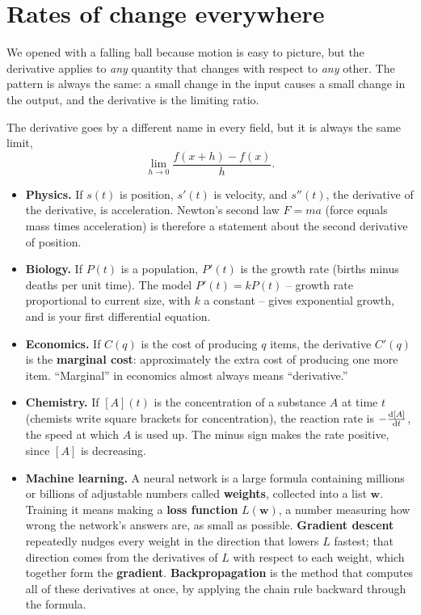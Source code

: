 \section{Rates of change everywhere}
\label{ch10:rates-everywhere}

We opened with a falling ball because motion is easy to picture, but the
derivative applies to \emph{any} quantity that changes with respect to
\emph{any} other. The pattern is always the same: a small change in the
input causes a small change in the output, and the derivative is the limiting
ratio.

\begin{applicationbox}
The derivative goes by a different name in every field, but it is always
the same limit,
\[
  \lim_{h\to 0}\frac{f(x+h)-f(x)}{h}.
\]
\begin{itemize}
  \item \textbf{Physics.} If $s(t)$ is position, $s'(t)$ is velocity, and
  $s''(t)$, the derivative of the derivative, is acceleration. Newton's second
  law $F = ma$ (force equals mass times acceleration) is therefore a statement
  about the second derivative of position.
  \item \textbf{Biology.} If $P(t)$ is a population, $P'(t)$ is the growth rate
  (births minus deaths per unit time). The model $P'(t) = kP(t)$ -- growth rate
  proportional to current size, with $k$ a constant -- gives exponential growth,
  and is your first differential equation.
  \item \textbf{Economics.} If $C(q)$ is the cost of producing $q$ items, the
  derivative $C'(q)$ is the \textbf{marginal cost}: approximately the extra cost
  of producing one more item. ``Marginal'' in economics
  almost always means ``derivative.''
  \item \textbf{Chemistry.} If $[A](t)$ is the concentration of a substance $A$
  at time $t$ (chemists write square brackets for concentration), the reaction
  rate is $-\frac{\mathrm{d} [A]}{\mathrm{d} t}$, the speed at which $A$ is used up. The minus sign makes
  the rate positive, since $[A]$ is decreasing.
  \item \textbf{Machine learning.} A neural network is a large formula containing
  millions or billions of adjustable numbers called \textbf{weights}, collected
  into a list $\mathbf{w}$. Training it means making a \textbf{loss function}
  $L(\mathbf{w})$, a number measuring how wrong the network's answers are, as
  small as possible. \textbf{Gradient descent} repeatedly nudges every weight in
  the direction that lowers $L$ fastest; that direction comes from the
  derivatives of $L$ with respect to each weight, which together form the
  \textbf{gradient}. \textbf{Backpropagation} is the method that computes all of
  these derivatives at once, by applying the chain rule backward through the
  formula.
\end{itemize}
\end{applicationbox}

